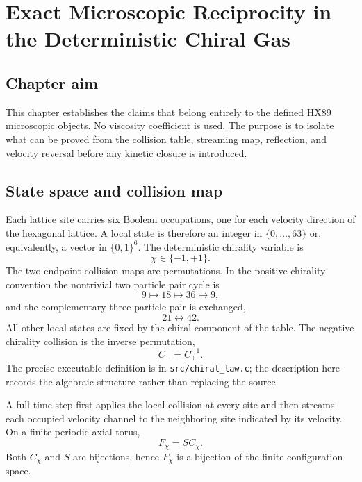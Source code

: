 \chapter{Exact Microscopic Reciprocity in the Deterministic Chiral Gas}\label{ch:microscopic}

\section{Chapter aim}
This chapter establishes the claims that belong entirely to the defined HX89 microscopic objects. No viscosity coefficient is used. The purpose is to isolate what can be proved from the collision table, streaming map, reflection, and velocity reversal before any kinetic closure is introduced.

\section{State space and collision map}
Each lattice site carries six Boolean occupations, one for each velocity direction of the hexagonal lattice. A local state is therefore an integer in $\{0,\ldots,63\}$ or, equivalently, a vector in $\{0,1\}^6$. The deterministic chirality variable is
\begin{equation}
 \chi\in\{-1,+1\}.
 \label{eq:chi_endpoint}
\end{equation}
The two endpoint collision maps are permutations. In the positive chirality convention the nontrivial two particle pair cycle is
\begin{equation}
 9\mapsto18\mapsto36\mapsto9,
 \label{eq:pair_cycle}
\end{equation}
and the complementary three particle pair is exchanged,
\begin{equation}
 21\leftrightarrow42.
 \label{eq:triple_swap}
\end{equation}
All other local states are fixed by the chiral component of the table. The negative chirality collision is the inverse permutation,
\begin{equation}
 C_{-}=C_{+}^{-1}.
 \label{eq:collision_inverse}
\end{equation}
The precise executable definition is in \texttt{src/chiral\_law.c}; the description here records the algebraic structure rather than replacing the source.

A full time step first applies the local collision at every site and then streams each occupied velocity channel to the neighboring site indicated by its velocity. On a finite periodic axial torus,
\begin{equation}
 F_\chi=S C_\chi.
 \label{eq:full_step}
\end{equation}
Both $C_\chi$ and $S$ are bijections, hence $F_\chi$ is a bijection of the finite configuration space.

